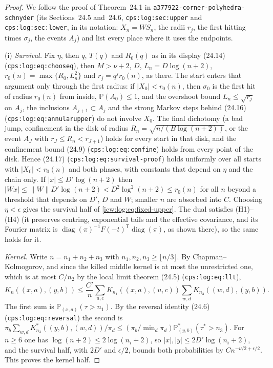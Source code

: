 \documentclass[11pt,letterpaper]{article}
\theoremstyle{remark}\newtheorem{remark}[theorem]{Remark}
\newcommand{\Prob}{\mathbb P}
\newcommand{\1}{\mathbf1}
\DeclareMathOperator{\diag}{diag}
\newcommand{\file}[1]{\textup{\nolinkurl{#1}}}
\begin{document}
\begin{proof}
We follow the proof of Theorem~24.1 in \file{a377922-corner-polyhedra-schnyder} (its Sections~24.5 and~24.6, \texttt{cps:log:sec:upper} and \texttt{cps:log:sec:lower}, in its notation: $X_n=WS_n$, the radii $r_j$, the first hitting times $\sigma_j$, the events $A_j$) and list every place where it uses the endpoints.

(i) \emph{Survival.} Fix $\eta$, then $q$, $T(q)$ and $R_0(q)$ as in its display (24.14) (\texttt{cps:log:eq:chooseq}), then $M>\nu+2$, $D$, $L_n=D\log(n+2)$, $r_0(n)=\max\{R_0,L_n^2\}$ and $r_j=q^jr_0(n)$, as there. The start enters that argument only through the first radius: if $|X_0|<r_0(n)$, then $\sigma_0$ is the first hit of radius $r_0(n)$ from inside, $\Prob(A_0)\le1$, and the overshoot bound $L_n\le\sqrt{r_j}$ on $A_j$, the inclusions $A_{j+1}\subset A_j$ and the strong Markov steps behind (24.16) (\texttt{cps:log:eq:annularupper}) do not involve $X_0$. The final dichotomy (a bad jump, confinement in the disk of radius $R_n=\sqrt{n/(B\log(n+2))}$, or the event $A_J$ with $r_J\le R_n<r_{J+1}$) holds for every start in that disk, and the confinement bound (24.9) (\texttt{cps:log:eq:confine}) holds from every point of the disk. Hence (24.17) (\texttt{cps:log:eq:survival-proof}) holds uniformly over all starts with $|X_0|<r_0(n)$ and both phases, with constants that depend on $\eta$ and the chain only. If $|x|\le D'\log(n+2)$ then $|Wx|\le\|W\|D'\log(n+2)<D^2\log^2(n+2)\le r_0(n)$ for all $n$ beyond a threshold that depends on $D'$, $D$ and $W$; smaller $n$ are absorbed into $C$. Choosing $\eta<\epsilon$ gives the survival half of \eqref{icw:log:eq:fixed-upper}. The dual satisfies (H1)--(H4) (it preserves centring, exponential tails and the effective covariance, and its Fourier matrix is $\diag(\pi)^{-1}F(-t)^{\mathsf T}\diag(\pi)$, as shown there), so the same holds for it.

\emph{Kernel.} Write $n=n_1+n_2+n_3$ with $n_1,n_2,n_3\ge\lfloor n/3\rfloor$. By Chapman--Kolmogorov, and since the killed middle kernel is at most the unrestricted one, which is at most $C/n_2$ by the local limit theorem (24.5) (\texttt{cps:log:eq:llt}),
\[
 K_n((x,a),(y,b))\le\frac{C'}n\sum_{u,c}K_{n_1}((x,a),(u,c))\sum_{w,d}K_{n_3}((w,d),(y,b)).
\]
The first sum is $\Prob_{(x,a)}(\tau>n_1)$. By the reversal identity (24.6) (\texttt{cps:log:eq:reversal}) the second is $\pi_b\sum_{w,d}K^*_{n_3}((y,b),(w,d))/\pi_d\le(\pi_b/\min_d\pi_d)\Prob^*_{(y,b)}(\tau^*>n_3)$. For $n\ge6$ one has $\log(n+2)\le2\log(n_i+2)$, so $|x|,|y|\le2D'\log(n_i+2)$, and the survival half, with $2D'$ and $\epsilon/2$, bounds both probabilities by $Cn^{-\nu/2+\epsilon/2}$. This proves the kernel half.


\end{proof}
\end{document}
